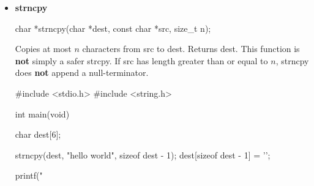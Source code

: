 \documentclass{report}
\begin{document}
\begin{itemize}
            \bigbreak \noindent 
            Copies the string src into dest, including the null terminator.
            \bigbreak \noindent 
            Returns dest.
        \item \textbf{strncpy}
            \bigbreak \noindent 
            \begin{cppcode}
            char *strncpy(char *dest, const char *src, size_t n);
            \end{cppcode}
            \bigbreak \noindent 
            Copies at most $n$ characters from src to dest.
            \bigbreak \noindent 
            Returns dest.
            \bigbreak \noindent 
            This function is \textbf{not} simply a safer strcpy. If src has length greater than or equal to $n$, strncpy does \textbf{not} append a null-terminator.
            \bigbreak \noindent 
            \begin{cppcode}
                #include <stdio.h>
                #include <string.h>

                int main(void) {
                    char dest[6];

                    strncpy(dest, "hello world", sizeof dest - 1);
                    dest[sizeof dest - 1] = '\0';

                    printf("%

}
\end{cppcode}
\end{itemize}
\end{document}
